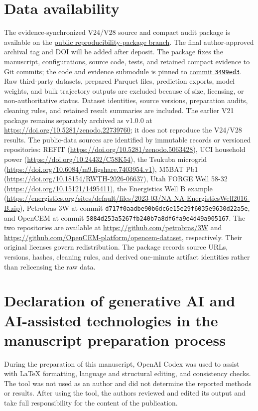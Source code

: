 \documentclass[a4paper,fleqn]{cas-sc}
\DeclareRobustCommand{\?}[1]{\u{#1}}
\DeclareRobustCommand{\>}[1]{\c{#1}}
\begin{document}
\section*{Data availability}
The evidence-synchronized V24/V28 source and compact audit package is available
on the \href{https://github.com/shixingzhang1994-byte/rig-energy-forecasting/tree/reproducibility-package-v24-v28}{public reproducibility-package branch}.
The final author-approved archival tag and DOI will be added after deposit.
The package fixes the manuscript, configurations, source code, tests, and retained
compact evidence to Git commits; the code and evidence submodule is pinned to
\href{https://github.com/shixingzhang1994-byte/rig-energy-forecasting/commit/3499ed37cb93684b90a30926be95400ac3f0a72c}{commit \texttt{3499ed3}}. Raw third-party
datasets, prepared Parquet files, prediction exports, model weights, and bulk
trajectory outputs are excluded because of size, licensing, or
non-authoritative status. Dataset identities, source versions, preparation
audits, cleaning rules, and retained result summaries are included. The earlier
V21 package remains separately archived as v1.0.0 at
\url{https://doi.org/10.5281/zenodo.22739760}; it does not reproduce the V24/V28
results.
The public-data sources are identified by immutable records or
versioned repositories: REFIT (\url{https://doi.org/10.5281/zenodo.5063428}),
UCI household power (\url{https://doi.org/10.24432/C58K54}), the Tsukuba
microgrid (\url{https://doi.org/10.6084/m9.figshare.7403954.v1}), M5BAT Pb1
(\url{https://doi.org/10.18154/RWTH-2026-06637}), Utah FORGE Well 58-32
(\url{https://doi.org/10.15121/1495411}), the Energistics Well B example
(\url{https://energistics.org/sites/default/files/2023-03/NA-NA-EnergisticsWell2016-B.zip}),
Petrobras 3W at commit \texttt{d717f0aadbe90b6dc6e15e29f6035e9630d22a5e},
and OpenCEM at commit \texttt{5884d253a5267fb240b7a8df6fa9e4d49a905167}.
The two repositories are available at \url{https://github.com/petrobras/3W}
and \url{https://github.com/OpenCEM-platform/opencem-dataset}, respectively.
Their original licenses govern redistribution. The package records source URLs,
versions, hashes, cleaning rules, and derived one-minute artifact identities
rather than relicensing the raw data.

\section*{Declaration of generative AI and AI-assisted technologies in the
manuscript preparation process}
During the preparation of this manuscript, OpenAI Codex was used to assist with
LaTeX formatting, language and structural editing, and consistency checks. The
tool was not used as an author and did not determine the reported methods or
results. After using the tool, the authors reviewed and edited its output and
take full responsibility for the content of the publication.



\end{document}
